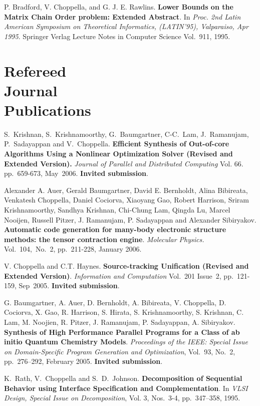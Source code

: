 \documentclass[11pt,margin,line]{res}
\begin{document}
\begin{resume}
P. Bradford, V. Choppella, and G. J. E. Rawlins.  %
{\bf Lower
  Bounds on the Matrix Chain Order problem: Extended
  Abstract}.  In {\em {Proc. 2nd Latin American Symposium on
    Theoretical Informatics, (LATIN'95), Valparaiso, Apr
    1995}}.  Springer Verlag Lecture Notes in Computer
Science Vol.~911, 1995.

\section{\sc Refereed\\ Journal\\ Publications}

S.~Krishnan, S.~Krishnamoorthy, G.~Baumgartner, C-C.~Lam,
J.~Ramanujam, P.~Sadayappan and V.~Choppella.  {\bf
  Efficient Synthesis of Out-of-core Algorithms Using a
  Nonlinear Optimization Solver (Revised and Extended
  Version).}  {\em {Journal of Parallel and Distributed
    Computing}} Vol. 66. pp.~659-673, May~2006.  {\bf
  Invited submission}.

Alexander A. Auer, Gerald Baumgartner, David E. Bernholdt,
Alina Bibireata, Venkatesh Choppella, Daniel Cociorva,
Xiaoyang Gao, Robert Harrison, Sriram Krishnamoorthy,
Sandhya Krishnan, Chi-Chung Lam, Qingda Lu, Marcel Nooijen,
Russell Pitzer, J. Ramanujam, P. Sadayappan and Alexander
Sibiryakov.  {\bf Automatic code generation for many-body
electronic structure methods: the tensor contraction
engine}.  {\em Molecular Physics.} Vol.~104,~No.~2,
pp.~211-228, January 2006.

V. Choppella and C.T. Haynes.  {\bf Source-tracking
Unification (Revised and Extended Version)}.  {\em
{Information and Computation}} Vol.~201 Issue~2,
pp.~121-159, Sep~2005.  {\bf Invited submission}.

G. Baumgartner, A. Auer, D. Bernholdt, A. Bibireata,
V. Choppella, D. Cociorva, X. Gao, R. Harrison, S. Hirata,
S. Krishnamoorthy, S. Krishnan, C. Lam, M. Noojien,
R. Pitzer, J. Ramanujam, P. Sadayappan, A. Sibiryakov.  {\bf
Synthesis of High Performance Parallel Programs for a Class
of ab initio Quantum Chemistry Models}.  {\em {Proceedings
of the IEEE: Special Issue on Domain-Specific Program
Generation and Optimization}}, Vol.~93, No.~2, pp.~276--292,
February 2005.  {\bf Invited submission}.

K.~Rath, V.~Choppella and S.~D.~Johnson.  {\bf Decomposition
of Sequential Behavior using Interface Specification and
Complementation}.  In {\em {VLSI Design, Special Issue on
Decomposition}}, Vol. 3, Nos.~3-4, pp.~347--358, 1995.


\end{resume}
\end{document}
